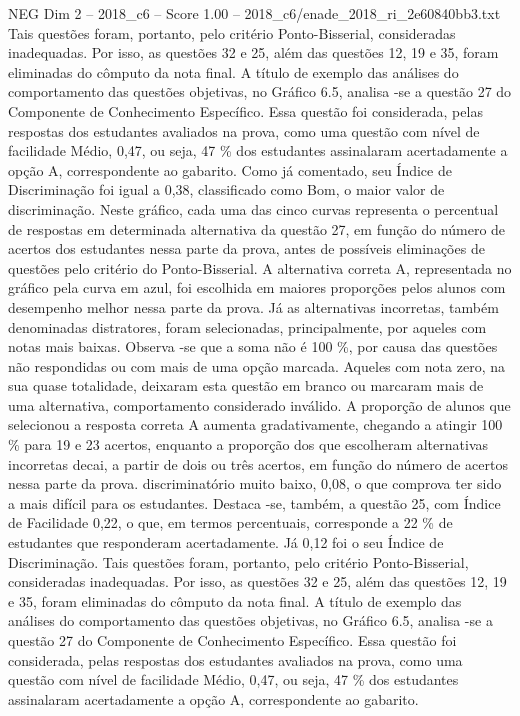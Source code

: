 \begin{textsample}{NEG Dim 2 – 2018\_c6 – Score 1.00 – 2018\_c6/enade\_2018\_ri\_2e60840bb3.txt}
Tais questões foram, portanto, pelo critério Ponto-Bisserial, consideradas inadequadas.
Por isso, as questões 32 e 25, além das questões 12, 19 e 35, foram eliminadas do cômputo da nota final.
A título de exemplo das análises do comportamento das questões objetivas, no Gráfico 6.5, analisa -se a questão 27 do Componente de Conhecimento Específico.
Essa questão foi considerada, pelas respostas dos estudantes avaliados na prova, como uma questão com nível de facilidade Médio, 0,47, ou seja, 47 \% dos estudantes assinalaram acertadamente a opção A, correspondente ao gabarito.
Como já comentado, seu Índice de Discriminação foi igual a 0,38, classificado como Bom, o maior valor de discriminação.
Neste gráfico, cada uma das cinco curvas representa o percentual de respostas em determinada alternativa da questão 27, em função do número de acertos dos estudantes nessa parte da prova, antes de possíveis eliminações de questões pelo critério do Ponto-Bisserial.
A alternativa correta A, representada no gráfico pela curva em azul, foi escolhida em maiores proporções pelos alunos com desempenho melhor nessa parte da prova.
Já as alternativas incorretas, também denominadas distratores, foram selecionadas, principalmente, por aqueles com notas mais baixas.
Observa -se que a soma não é 100 \%, por causa das questões não respondidas ou com mais de uma opção marcada.
Aqueles com nota zero, na sua quase totalidade, deixaram esta questão em branco ou marcaram mais de uma alternativa, comportamento considerado inválido.
A proporção de alunos que selecionou a resposta correta A aumenta gradativamente, chegando a atingir 100 \% para 19 e 23 acertos, enquanto a proporção dos que escolheram alternativas incorretas decai, a partir de dois ou três acertos, em função do número de acertos nessa parte da prova. discriminatório muito baixo, 0,08, o que comprova ter sido a mais difícil para os estudantes.
Destaca -se, também, a questão 25, com Índice de Facilidade 0,22, o que, em termos percentuais, corresponde a 22 \% de estudantes que responderam acertadamente.
Já 0,12 foi o seu Índice de Discriminação.
Tais questões foram, portanto, pelo critério Ponto-Bisserial, consideradas inadequadas.
Por isso, as questões 32 e 25, além das questões 12, 19 e 35, foram eliminadas do cômputo da nota final.
A título de exemplo das análises do comportamento das questões objetivas, no Gráfico 6.5, analisa -se a questão 27 do Componente de Conhecimento Específico.
Essa questão foi considerada, pelas respostas dos estudantes avaliados na prova, como uma questão com nível de facilidade Médio, 0,47, ou seja, 47 \% dos estudantes assinalaram acertadamente a opção A, correspondente ao gabarito.

\end{textsample}
